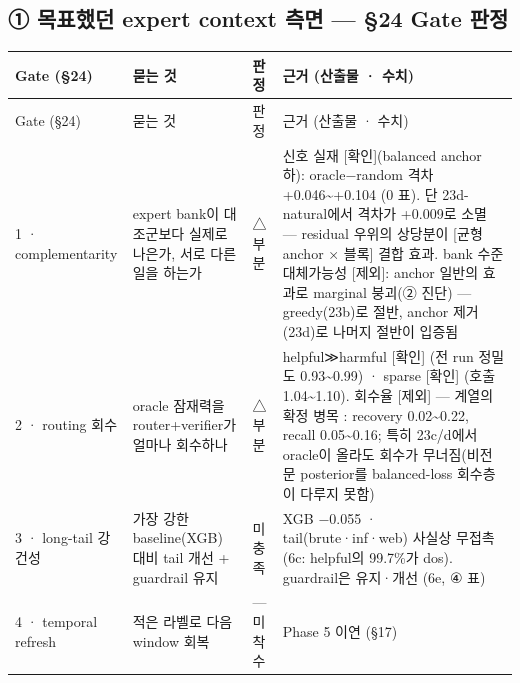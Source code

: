 \subsection*{① 목표했던 expert context 측면 — §24 Gate 판정}
\begingroup
\footnotesize
\begin{longtable}{>{\raggedright\arraybackslash}p{}>{\raggedright\arraybackslash}p{}>{\raggedright\arraybackslash}p{}>{\raggedright\arraybackslash}p{}}
\toprule
Gate (§24) & 묻는 것 & 판정 & 근거 (산출물 · 수치) \\ \midrule
\endfirsthead
Gate (§24) & 묻는 것 & 판정 & 근거 (산출물 · 수치) \\ \midrule
\endhead
{}1 · complementarity & expert bank이 대조군보다 실제로 나은가, 서로 다른 일을 하는가 & △ 부분 & 신호 실재 [확인](balanced anchor 하): oracle−random 격차 +\allowbreak{}0.046\textasciitilde{}+\allowbreak{}0.104 (0 표). 단 23d-natural에서 격차가 +\allowbreak{}0.009로 소멸 — residual 우위의 상당분이 [균형 anchor × 블록] 결합 효과. bank 수준 대체가능성 [제외]: anchor 일반의 효과로 marginal 붕괴(② 진단) — greedy(23b)로 절반, anchor 제거(23d)로 나머지 절반이 입증됨 \\
{}2 · routing 회수 & oracle 잠재력을 router+\allowbreak{}verifier가 얼마나 회수하나 & △ 부분 & helpful≫harmful [확인] (전 run 정밀도 0.93\textasciitilde{}0.99) · sparse [확인] (호출 1.04\textasciitilde{}1.10). 회수율 [제외] — 계열의 확정 병목 : recovery 0.02\textasciitilde{}0.22, recall 0.05\textasciitilde{}0.16; 특히 23c/\allowbreak{}d에서 oracle이 올라도 회수가 무너짐(비전문 posterior를 balanced-loss 회수층이 다루지 못함) \\
{}3 · long-tail 강건성 & 가장 강한 baseline(XGB) 대비 tail 개선 +\allowbreak{} guardrail 유지 & [제외] 미충족 & XGB −0.055 · tail(brute·inf·web) 사실상 무접촉 (6c: helpful의 99.7\%가 dos). guardrail은 유지·개선 (6e, ④ 표) \\
{}4 · temporal refresh & 적은 라벨로 다음 window 회복 & — 미착수 & Phase 5 이연 (§17) \\
\bottomrule
\end{longtable}
\endgroup
